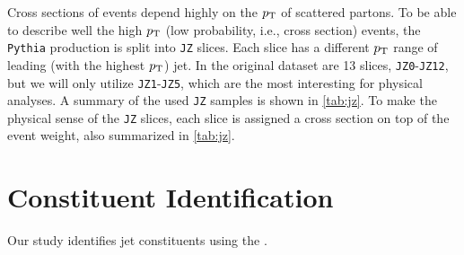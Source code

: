 Cross sections of events depend highly on the $p_\text{T}$ of scattered partons. 
To be able to describe well the high $p_\text{T}$ (low probability, i.e., cross section) events, the \MC \texttt{Pythia} production is split into \texttt{JZ} slices. 
Each slice has a different $p_\text{T}$ range of leading (with the highest $p_\text{T}$) jet.
In the original dataset are 13 slices, \texttt{JZ0}-\texttt{JZ12}, but we will only utilize \texttt{JZ1}-\texttt{JZ5}, which are the most interesting for physical analyses.
A summary of the used \texttt{JZ} samples is shown in \cref{tab:jz}. 
To make the physical sense of the \texttt{JZ} slices, each slice is assigned a cross section on top of the event weight, also summarized in \cref{tab:jz}.




\section{Constituent Identification}
\label{sec:pfo}
Our study identifies jet constituents using the \PFa \cite{PFO}.

